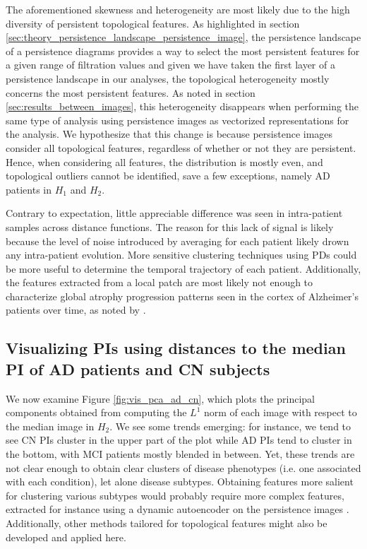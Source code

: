 \documentclass{article}
\begin{document}
The aforementioned skewness and heterogeneity are most likely due to the high diversity of persistent
topological features. As highlighted in section
\ref{sec:theory_persistence_landscape_persistence_image}, the persistence landscape of a persistence
diagrams provides a way to select the most persistent features for a given range of filtration
values and given we have taken the first layer of a persistence landscape in our analyses, the
topological heterogeneity mostly concerns the most persistent features. As noted in section
\ref{sec:results_between_images}, this heterogeneity disappears when performing the same type of
analysis using persistence images as vectorized representations for the analysis. We hypothesize
that this change is because persistence images consider all topological features,
regardless of whether or not they are persistent. Hence, when considering all features, the
distribution is mostly even, and topological outliers cannot be identified, save a few exceptions,
namely AD patients in $H_1$ and $H_2$.

Contrary to expectation, little appreciable difference was seen in intra-patient samples across
distance functions. The reason for this lack of signal is likely because the level of
noise introduced by averaging for each patient likely drown any intra-patient evolution. More
sensitive clustering techniques using PDs could be more useful to determine the temporal trajectory
of each patient. Additionally, the features extracted from a local patch are most likely
not enough to characterize global atrophy progression patterns seen in the cortex of Alzheimer's
patients over time, as noted by \citep{toniolo2018patterns}.

\subsection{Visualizing PIs using distances to the median PI of AD patients and CN subjects}

We now examine Figure \ref{fig:vis_pca_ad_cn}, which plots the principal components obtained from
computing the $L^1$ norm of each image with respect to the median image in $H_2$. We see some trends
emerging: for instance, we tend to see CN PIs cluster in the upper part of the plot while AD PIs
tend to cluster in the bottom, with MCI patients mostly blended in between. Yet, these trends are
not clear enough to obtain clear clusters of disease phenotypes (i.e. one associated with each
condition), let alone disease subtypes. Obtaining features more salient for clustering various
subtypes would probably require more complex features, extracted for instance using a dynamic
autoencoder on the persistence images \citep{mrabah2019deep}. Additionally, other methods tailored
for topological features might also be developed and applied here.
\end{document}
